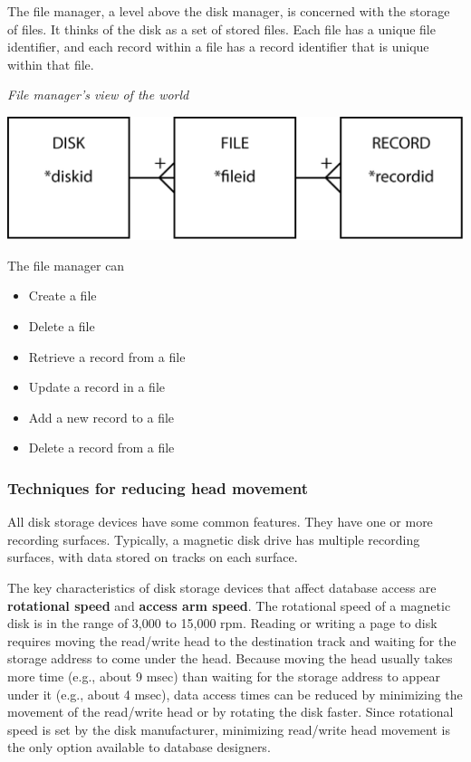 \documentclass[
]{article}
\begin{document}
The file manager, a level above the disk manager, is concerned with the
storage of files. It thinks of the disk as a set of stored files. Each
file has a unique file identifier, and each record within a file has a
record identifier that is unique within that file.

\emph{File manager's view of the world}

\includegraphics{Figures/Chapter 20/file-manager.png}

The file manager can

\begin{itemize}
\item
  Create a file
\item
  Delete a file
\item
  Retrieve a record from a file
\item
  Update a record in a file
\item
  Add a new record to a file
\item
  Delete a record from a file
\end{itemize}

\hypertarget{techniques-for-reducing-head-movement}{%
\subsubsection*{Techniques for reducing head movement}\label{techniques-for-reducing-head-movement}}

All disk storage devices have some common features. They have one or
more recording surfaces. Typically, a magnetic disk drive has multiple
recording surfaces, with data stored on tracks on each surface.

The key characteristics of disk storage devices that affect database
access are \textbf{rotational speed} and \textbf{access arm speed}. The rotational
speed of a magnetic disk is in the range of 3,000 to 15,000 rpm. Reading
or writing a page to disk requires moving the read/write head to the
destination track and waiting for the storage address to come under the
head. Because moving the head usually takes more time (e.g., about 9
msec) than waiting for the storage address to appear under it (e.g.,
about 4 msec), data access times can be reduced by minimizing the
movement of the read/write head or by rotating the disk faster. Since
rotational speed is set by the disk manufacturer, minimizing read/write
head movement is the only option available to database designers.
\end{document}
